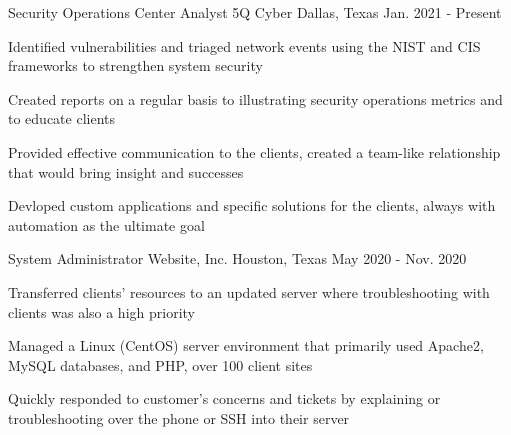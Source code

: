 \begin{cventries}
\cventry
  {Security Operations Center Analyst} %
  {5Q Cyber} %
  {Dallas, Texas} %
  {Jan. 2021 - Present} %
  {
    \begin{cvitems}
      \item {Identified vulnerabilities and triaged network events using the NIST and CIS frameworks to strengthen system security}
      \item {Created reports on a regular basis to illustrating security operations metrics and to educate clients}
      \item {Provided effective communication to the clients, created a team-like relationship that would bring insight and successes}
      \item {Devloped custom applications and specific solutions for the clients, always with automation as the ultimate goal} 
    \end{cvitems}
  }
\cventry
  {System Administrator} %
  {Website, Inc.} %
  {Houston, Texas} %
  {May 2020 - Nov. 2020} %
  {
    \begin{cvitems}
      \item{Transferred clients' resources to an updated server where troubleshooting with clients was also a high priority}
      \item {Managed a Linux (CentOS) server environment that primarily used Apache2, MySQL databases, and PHP, over 100 client sites}
      \item {Quickly responded to customer's concerns and tickets by explaining or troubleshooting over the phone or SSH into their server}
    \end{cvitems}
  }
  \end{cventries}

